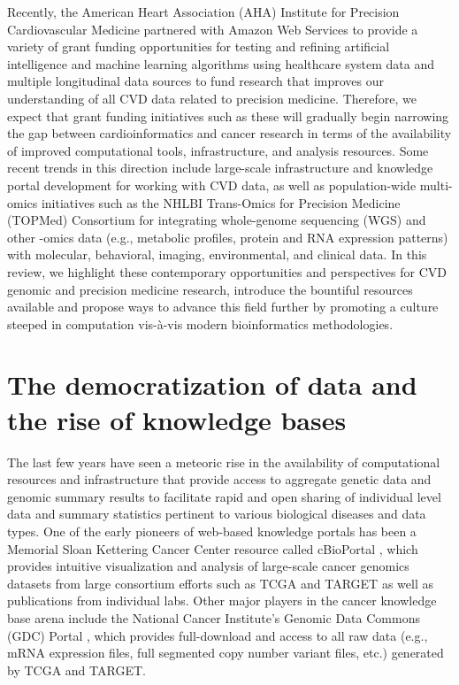 \documentclass[letter]{bioinfo}
\begin{document}
Recently, the American Heart Association (AHA) Institute for Precision Cardiovascular Medicine partnered with Amazon Web Services to provide a variety of grant funding opportunities for testing and refining artificial intelligence and machine learning algorithms using healthcare system data and multiple longitudinal data sources to fund research that improves our understanding of all CVD data related to precision medicine.  Therefore, we expect that grant funding initiatives such as these will gradually begin narrowing the gap between cardioinformatics and cancer research in terms of the availability of improved computational tools, infrastructure, and analysis resources.  Some recent trends in this direction include large-scale infrastructure and knowledge portal development \citep{Kass-Hout:2018:American, Khomtchouk:2018:HeartBioPortal, Broad:NA:Cardiovascular, Broad:NA:Cerebrovascular} for working with CVD data, as well as population-wide multi-omics initiatives such as the NHLBI Trans-Omics for Precision Medicine (TOPMed) Consortium \citep{NHLBI:2014:TransOmics} for integrating whole-genome sequencing (WGS) and other -omics data (e.g., metabolic profiles, protein and RNA expression patterns) with molecular, behavioral, imaging, environmental, and clinical data.  In this review, we highlight these contemporary opportunities and perspectives for CVD genomic and precision medicine research, introduce the bountiful resources available and propose ways to advance this field further by promoting a culture steeped in computation vis-\`{a}-vis modern bioinformatics methodologies.


\section*{The democratization of data and the rise of knowledge bases}

The last few years have seen a meteoric rise in the availability of computational resources and infrastructure that provide access to aggregate genetic data and genomic summary results to facilitate rapid and open sharing of individual level data and summary statistics pertinent to various biological diseases and data types.  One of the early pioneers of web-based knowledge portals has been a Memorial Sloan Kettering Cancer Center resource called cBioPortal \citep{Cerami:2012:cBio,Gao:2013:Integrative}, which provides intuitive visualization and analysis of large-scale cancer genomics datasets from large consortium efforts such as TCGA \citep{TheCancerGenomeAtlasResearchNetwork:2013:Cancer} and TARGET \citep{Koscielny:2017:Open} as well as publications from individual labs.  Other major players in the cancer knowledge base arena include the National Cancer Institute's Genomic Data Commons (GDC) Portal \citep{Grossman:2016:Shared,Jensen:2017:NCI}, which provides full-download and access to all raw data (e.g., mRNA expression files, full segmented copy number variant files, etc.) generated by TCGA and TARGET.
	
\end{document}
